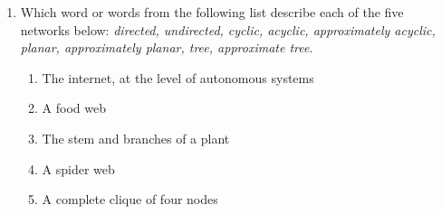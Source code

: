\documentclass{amsart}
\theoremstyle{definition}
\theoremstyle{remark}
\numberwithin{equation}{section}
\begin{document}
\begin{enumerate}
\vspace{0.5cm}
\textbf{ \larger[3]Solution} 
\vspace{0.5cm}
\begin{enumerate}
    \item Find the adjacency matrix of network (a)
    \begin{equation*}
        {A}  = \left\lbrack\begin{array}{ccccc}
        0 & 1 & 0 & 0 & 1 \\
        0 & 0 & 1 & 0 & 0 \\
        1 & 0 & 0 & 0 & 1 \\
        0 & 1 & 1 & 0 & 0 \\
        0 & 0 & 0 & 0 & 0 \\
        \end{array}\right\rbrack
    \end{equation*}
    \item Find the incidence matrix of network (b)
    \begin{equation*}
        {A}  = \left\lbrack\begin{array}{cccc}
        1 & 0 & 0 & 0 \\
        0 & 1 & 0 & 1 \\
        1 & 1 & 0 & 1 \\
        0 & 0 & 1 & 1 \\
        0 & 0 & 0 & 1 \\
        \end{array}\right\rbrack
    \end{equation*}
\end{enumerate}
\vspace{5cm}

\clearpage
\item Which word or words from the following list describe each of the five networks below: {\em directed, undirected, cyclic, acyclic, approximately acyclic, planar, approximately planar, tree, approximate tree}.
\begin{enumerate}
\item The internet, at the level of autonomous systems
\item A food web
\item The stem and branches of a plant
\item A spider web
\item A complete clique of four nodes
\end{enumerate}


\end{enumerate}
\end{document}
